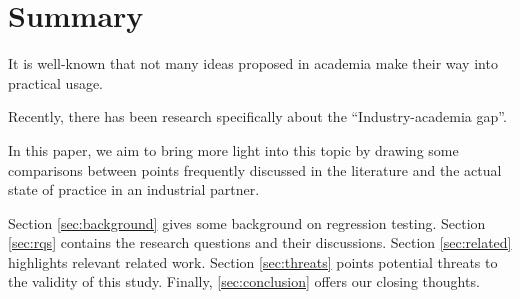 \section{Summary}\label{sec:ind_summary}

It is well-known that not many ideas proposed in academia make their way into practical usage.

Recently, there has been research specifically about the ``Industry-academia gap''.

In this paper, we aim to bring more light into this topic by drawing some comparisons between points frequently discussed in the literature and the actual state of practice in an industrial partner.

Section \ref{sec:background} gives some background on regression testing. Section \ref{sec:rqs} contains the research questions and their discussions. Section \ref{sec:related} highlights relevant related work. Section \ref{sec:threats} points potential threats to the validity of this study. Finally, \ref{sec:conclusion} offers our closing thoughts.
